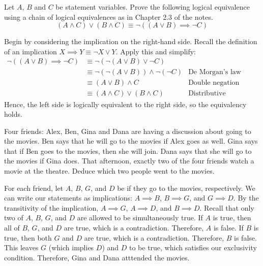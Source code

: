 \begin{recommended}
  Let $A$, $B$ and $C$ be statement variables.
  Prove the following logical equivalence using a chain of logical equivalences as in Chapter 2.3 of the notes.
  \[
    (A \land C) \lor (B \land C) \equiv \lnot((A \lor B) \implies \lnot C)
  \]
\end{recommended}
\begin{prf}
  Begin by considering the implication on the right-hand side.
  Recall the definition of an implication $X \implies Y \equiv \lnot X \lor Y$.
  Apply this and simplify:
  \begin{align*}
    \lnot((A \lor B) \implies \lnot C) & \equiv \lnot(\lnot (A \lor B) \lor \lnot C)                                           \\
                                       & \equiv \lnot(\lnot (A \lor B)) \land \lnot(\lnot C) & \text{De Morgan's law}          \\
                                       & \equiv (A \lor B) \land C                           & \text{Double negation}          \\
                                       & \equiv (A \land C) \lor (B \land C)                 & \text{Distributive conjunction}
  \end{align*}
  Hence, the left side is logically equivalent to the right side, so the equivalency holds.
\end{prf}

\begin{recommended}
  Four friends: Alex, Ben, Gina and Dana are having a discussion about going to the movies.
  Ben says that he will go to the movies if Alex goes as well.
  Gina says that if Ben goes to the movies, then she will join.
  Dana says that she will go to the movies if Gina does.
  That afternoon, exactly two of the four friends watch a movie at the theatre.
  Deduce which two people went to the movies.
\end{recommended}
\begin{prf}
  For each friend, let $A$, $B$, $G$, and $D$ be if they go to the movies, respectively.
  We can write our statements as implications: $A \implies B$, $B \implies G$, and $G \implies D$.
  By the transitivity of the implication, $A \implies G$, $A \implies D$, and $B \implies D$.
  Recall that only two of $A$, $B$, $G$, and $D$ are allowed to be simultaneously true.
  If $A$ is true, then all of $B$, $G$, and $D$ are true, which is a contradiction.
  Therefore, $A$ is false.
  If $B$ is true, then both $G$ and $D$ are true, which is a contradiction.
  Therefore, $B$ is false.
  This leaves $G$ (which implies $D$) and $D$ to be true, which satisfies our exclusivity condition.
  Therefore, Gina and Dana atttended the movies.
\end{prf}

